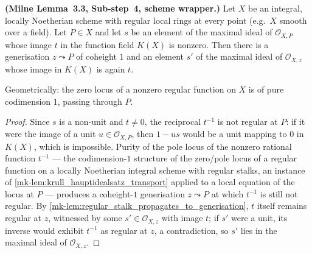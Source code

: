 \begin{lemma}\label{mk-lem:milne33_diagonal_vanishing_purity}
  \leanok


  \textbf{(Milne Lemma~3.3, Sub-step~4, scheme wrapper.)} Let \(X\) be an
  integral, locally Noetherian scheme with regular local rings at every point
  (e.g.\ \(X\) smooth over a field). Let \(P \in X\) and let \(s\) be an
  element of the maximal ideal of \(\mathcal O_{X,P}\) whose image \(t\) in
  the function field \(K(X)\) is nonzero. Then there is a generisation
  \(z \leadsto P\) of coheight \(1\) and an element \(s'\) of the maximal
  ideal of \(\mathcal O_{X,z}\) whose image in \(K(X)\) is again \(t\).

  Geometrically: the zero locus of a nonzero regular function on \(X\) is of
  pure codimension \(1\), passing through \(P\).
\end{lemma}
\begin{proof}
  \leanok{}
  Since \(s\) is a non-unit and \(t \neq 0\), the reciprocal \(t^{-1}\) is not
  regular at \(P\): if it were the image of a unit \(u \in \mathcal O_{X,P}\),
  then \(1 - us\) would be a unit mapping to \(0\) in \(K(X)\), which is
  impossible. Purity of the pole locus of the nonzero rational function
  \(t^{-1}\) --- the codimension-\(1\) structure of the zero/pole locus of a
  regular function on a locally Noetherian integral scheme with regular
  stalks, an instance of \ref{mk-lem:krull_hauptidealsatz_transport} applied to
  a local equation of the locus at \(P\) --- produces a coheight-\(1\)
  generisation \(z \leadsto P\) at which \(t^{-1}\) is still not regular. By
  \ref{mk-lem:regular_stalk_propagates_to_generisation}, \(t\) itself remains
  regular at \(z\), witnessed by some \(s' \in \mathcal O_{X,z}\) with image
  \(t\); if \(s'\) were a unit, its inverse would exhibit \(t^{-1}\) as
  regular at \(z\), a contradiction, so \(s'\) lies in the maximal ideal of
  \(\mathcal O_{X,z}\).
\end{proof}

